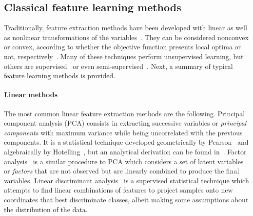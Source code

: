 \documentclass[
	fontsize=11pt, %
	twoside=false, %
	open=any, %
	secnumdepth=1, %
]{kaobook}
\begin{document}
\subsection{Classical feature learning methods}

Traditionally, feature extraction methods have been developed with linear as well as nonlinear transformations of the variables~\cite{featext}. They can be considered nonconvex or convex, according to whether the objective function presents local optima or not, respectively~\cite{DimRecComparative}. Many of these techniques perform unsupervised learning, but others are supervised~\cite{FisherLDA,lds,adv} or even semi-supervised~\cite{lsss}. Next, a summary of typical feature learning methods is provided.

\paragraph{Linear methods} The most common linear feature extraction methods are the following. Principal component analysis (PCA) consists in extracting successive variables or \textit{principal components} with maximum variance while being uncorrelated with the previous components. It is a statistical technique developed geometrically by Pearson~\cite{PCA} and algebraically by Hotelling~\cite{PCAHotelling}, but an analytical derivation can be found in~\cite{PCABook}. Factor analysis~\cite{PCAandFA} is a similar procedure to PCA which considers a set of latent variables or \textit{factors} that are not observed but are linearly combined to produce the final variables. Linear discriminant analysis~\cite{FisherLDA} is a supervised statistical technique which attempts to find linear combinations of features to project samples onto new coordinates that best discriminate classes, albeit making some assumptions about the distribution of the data. 
\end{document}
